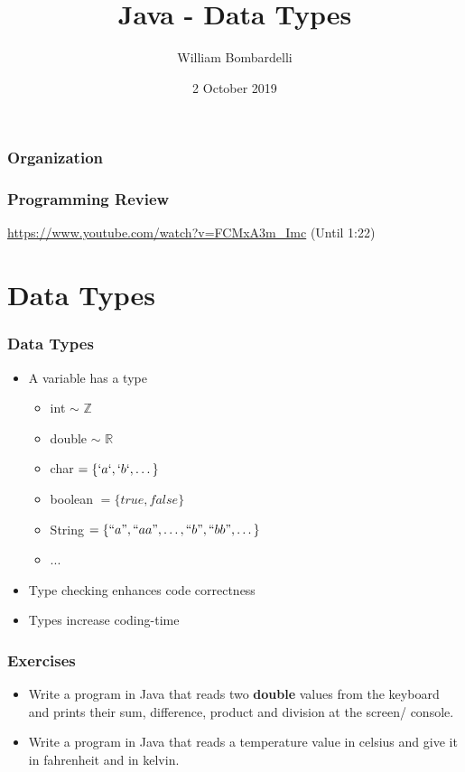 \documentclass{beamer}
\title[Java]{Java - Data Types}
\author[W. Bombardelli]{William Bombardelli}
\institute[Schweizerschule Mexiko]
{
	\vskip 12pt
	Schweizerschule Mexiko, Ciudad de México, Mexico \\
	\texttt{\url{https://github.com/wbombardellis/java-unterricht}}
}
\date{2 October 2019}
\begin{document}
	\begin{frame}
		\titlepage
	\end{frame}
	
	\begin{frame}
		\frametitle{Organization}
		\tableofcontents
	\end{frame}

	\begin{frame}
		\frametitle{Programming Review}
		\url{https://www.youtube.com/watch?v=FCMxA3m_Imc} (Until 1:22)
	\end{frame}

	\section{Data Types}
	\begin{frame}
		\frametitle{Data Types}
		\begin{itemize}
			\item A variable has a type
			\begin{itemize}
				\item int $\sim$ $\mathbb{Z}$
				\item double $\sim$ $\mathbb{R}$
				\item char $= \{`a`, `b`, \dots \}$
				\item boolean $= \{true, false\}$
				\item String $= \{``a", ``aa", \dots, ``b", ``bb", \dots \}$
				\item ...
			\end{itemize}
			\pause
			\item {\color{green} Type checking enhances code correctness}
			\pause
			\item {\color{red} Types increase coding-time}
		\end{itemize}
	\end{frame}

	\begin{frame}
		\frametitle{Exercises}
		\begin{itemize}
			\item Write a program in Java that reads two \textbf{double} values from the keyboard and prints their sum, difference, product and division at the screen/ console.
			\pause
			\item Write a program in Java that reads a temperature value in celsius and give it in fahrenheit and in kelvin.
		\end{itemize}
	\end{frame}
	
\end{document}
